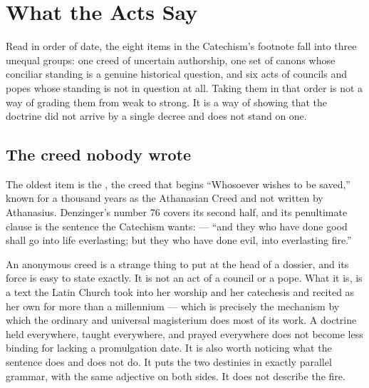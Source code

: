 \section{What the Acts Say}

Read in order of date, the eight items in the Catechism's footnote fall into three unequal groups: one creed of uncertain authorship, one set of canons whose conciliar standing is a genuine historical question, and six acts of councils and popes whose standing is not in question at all. Taking them in that order is not a way of grading them from weak to strong. It is a way of showing that the doctrine did not arrive by a single decree and does not stand on one.

\subsection{The creed nobody wrote}

The oldest item is the , the creed that begins ``Whosoever wishes to be saved,'' known for a thousand years as the Athanasian Creed and not written by Athanasius. Denzinger's number 76 covers its second half, and its penultimate clause is the sentence the Catechism wants:  --- ``and they who have done good shall go into life everlasting; but they who have done evil, into everlasting fire.''

An anonymous creed is a strange thing to put at the head of a dossier, and its force is easy to state exactly. It is not an act of a council or a pope. What it is, is a text the Latin Church took into her worship and her catechesis and recited as her own for more than a millennium --- which is precisely the mechanism by which the ordinary and universal magisterium does most of its work. A doctrine held everywhere, taught everywhere, and prayed everywhere does not become less binding for lacking a promulgation date. It is also worth noticing what the sentence does and does not do. It puts the two destinies in exactly parallel grammar, with the same adjective on both sides. It does not describe the fire.

